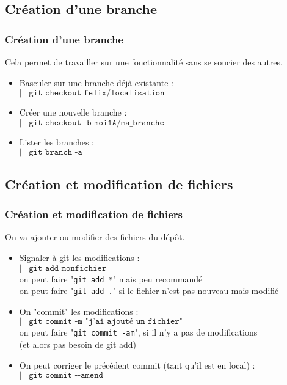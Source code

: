 \documentclass[9pt,a9paper,handout]{beamer}
\newcommand{\command}[1]{$\left|\;\;\;\texttt{#1}\right.$}
\begin{document}
\subsection{Création d'une branche}
\begin{frame}
\frametitle{Création d'une branche}
Cela permet de travailler sur une fonctionnalité sans se soucier des autres.
\begin{itemize}
    \item Basculer sur une branche déjà existante :\\
        \command{git checkout felix/localisation}
    \item Créer une nouvelle branche :\\
        \command{git checkout -b moi1A/ma\_branche}
    \item Lister les branches :\\
        \command{git branch -a}
\end{itemize}
\end{frame}

\subsection{Création et modification de fichiers}
\begin{frame}
\frametitle{Création et modification de fichiers}
On va ajouter ou modifier des fichiers du dépôt.
\begin{itemize}
    \item Signaler à git les modifications :\\
    \command{git add monfichier}\\
        on peut faire "\texttt{git add *}" mais peu recommandé\\
        on peut faire "\texttt{git add .}" si le fichier n'est pas nouveau mais modifié\\
    \item On "commit" les modifications :\\
        \command{git commit -m "j'ai ajouté un fichier"}\\
        on peut faire "\texttt{git commit -am}", si il n'y a pas de modifications \\(et alors pas besoin de git add)
    \item On peut corriger le précédent commit (tant qu'il est en local) :
        \command{git commit -{}-amend}
\end{itemize}
\end{frame}
\end{document}
